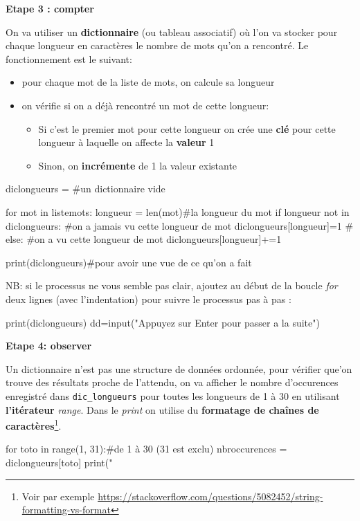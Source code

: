 \textbf{Etape 3 : compter}

On va utiliser un \textbf{dictionnaire} (ou tableau associatif) où
l'on va stocker pour chaque longueur en caractères le nombre de mots
qu'on a rencontré. Le fonctionnement est le suivant: 
\begin{itemize}
\item pour chaque mot de la liste de mots, on calcule sa longueur 
\item on vérifie si on a déjà rencontré un mot de cette longueur: 
\begin{itemize}
\item Si c'est le premier mot pour cette longueur on crée une \textbf{clé}
pour cette longueur à laquelle on affecte la \textbf{valeur} 1 
\item Sinon, on \textbf{incrémente} de 1 la valeur existante 
\end{itemize}
\end{itemize}
\begin{python} diclongueurs = {} \#un dictionnaire vide

for mot in listemots: longueur = len(mot)\#la longueur du mot if longueur
not in diclongueurs: \#on a jamais vu cette longueur de mot diclongueurs{[}longueur{]}=1
\# else: \#on a vu cette longueur de mot diclongueurs{[}longueur{]}+=1

print(diclongueurs)\#pour avoir une vue de ce qu'on a fait

\end{python}

NB: si le processus ne vous semble pas clair, ajoutez au début de
la boucle \textit{for} deux lignes (avec l'indentation) pour suivre
le processus pas à pas :

\begin{python} print(diclongueurs) dd=input("Appuyez sur Enter pour
passer a la suite") \end{python}

\textbf{Etape 4: observer}

Un dictionnaire n'est pas une structure de données ordonnée, pour
vérifier que'on trouve des résultats proche de l'attendu, on va afficher
le nombre d'occurences enregistré dans \texttt{dic\_longueurs} pour
toutes les longueurs de 1 à 30 en utilisant \textbf{l'itérateur} \textit{range}.
Dans le \textit{print} on utilise du \textbf{formatage de chaînes
de caractères}\footnote{Voir par exemple \url{https://stackoverflow.com/questions/5082452/string-formatting-vs-format}}.

\begin{python} for toto in range(1, 31):\#de 1 à 30 (31 est exclu)
nbroccurences = diclongueurs{[}toto{]} print("%
\end{python}

